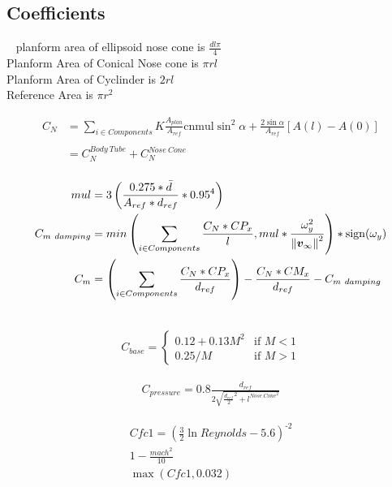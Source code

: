 \subsection{Coefficients} \label{subsec:Coefficients}
~\cite{OR}
planform area of ellipsoid nose cone is $ \frac{d l \pi}{4}$ \\
Planform Area of Conical Nose cone is $ \pi r l$ \\
Planform Area of Cyclinder is $ 2 r l$ \\
Reference Area is $ \pi r^2 $

\begin{align}
    C_{N} &= \sum_{i \in Components} K \frac{A_{plan}}{A_{ref}} \mathrm{cnmul}\sin^2\alpha + \frac{2 \sin\alpha}{A_{ref}} [A(l)-A(0)] \\ \\
    &= C_{N}^{Body\ Tube} + C_{N}^{Nose\ Cone} \\
\end{align}

\begin{align}
    mul &= 3 \left( \frac{0.275 * \bar{d}}{A_{ref} * d_{ref}} * 0.95^4 \right) \\
    C_{m\ damping} &= min \left( \sum_{i \in Components} \frac{C_N * CP_x}{l}, mul * \frac{\omega_y^2}{\norm{\bm v_\infty}^2} \right) * \operatorname{sign}(\omega_y) \\
    C_m &= \left( \sum_{i \in Components} \frac{C_N * CP_x}{d_{ref}} \right) - \frac{C_N * CM_x}{d_{ref}} - C_{m\ damping}
\end{align}  

~\cite{fleeman_2006}
\begin{equation}
    \begin{split}
    C_{base} = 
        \begin{cases}
          0.12+0.13M^2 & \mbox{if $M<1$} \\
          0.25/M       & \mbox{if $M>1$}
        \end{cases}
    \end{split}
\end{equation} 

\begin{align}
    C_{pressure} = 0.8 \frac{d_{ref}}{2 \sqrt{\frac{d_{ref}}{2}^2 + l^{{Nose\ Cone}^2}}}
\end{align}

\begin{align}
    Cfc1 = (\frac{3}{2} \ln{Reynolds} - 5.6)^{\text{-}2} \\
    1 - \frac{mach^2}{10} \\
    \max(Cfc1, 0.032 )
\end{align}

